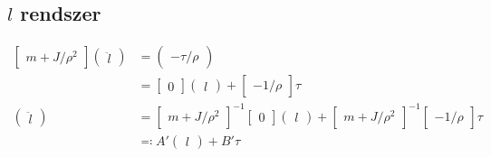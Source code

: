 \documentclass{article}
\begin{document}
	\subsection{$l$ rendszer}
		\begin{align}
			\begin{bmatrix}
				m+J/\rho^2
			\end{bmatrix}
			\begin{pmatrix}
				\ddot{l}
			\end{pmatrix}
			&=
			\begin{pmatrix}
				-\tau/\rho
			\end{pmatrix} \\
			& =
			\begin{bmatrix}
				0
			\end{bmatrix}
			\begin{pmatrix}
				l
			\end{pmatrix}
			+
			\begin{bmatrix}
				-1/\rho
			\end{bmatrix}
			\tau \\
			\begin{pmatrix}
				\ddot{l}
			\end{pmatrix}
			& =
			\begin{bmatrix}
				m+J/\rho^2
			\end{bmatrix}^{-1}
			\begin{bmatrix}
				0
			\end{bmatrix}
			\begin{pmatrix}
				l
			\end{pmatrix}
			+
			\begin{bmatrix}
				m+J/\rho^2
			\end{bmatrix}^{-1}
			\begin{bmatrix}
				-1/\rho
			\end{bmatrix}
			\tau \\
			& \eqqcolon
			A'
			\begin{pmatrix}
				l
			\end{pmatrix}
			+
			B'
			\tau
        \end{align}
\end{document}
